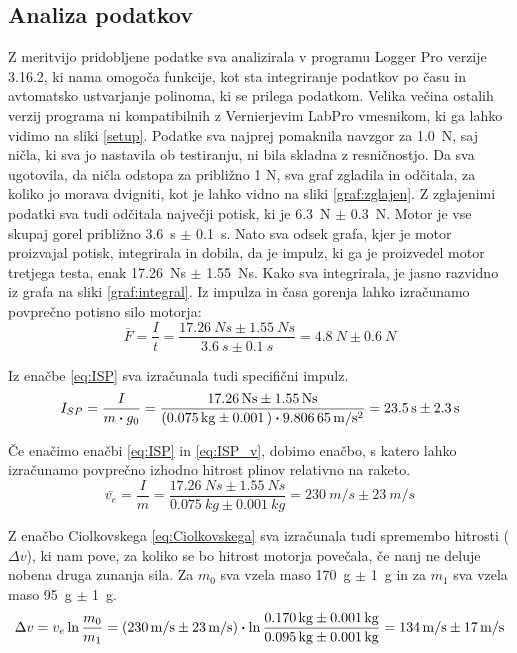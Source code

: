 \documentclass[titlepage, a4paper, twoside, final, 12pt]{article}
\begin{document}
		\subsection{Analiza podatkov}
		Z meritvijo pridobljene podatke sva analizirala v programu Logger Pro verzije 3.16.2, ki nama omogoča funkcije, kot sta integriranje podatkov po času in
		avtomatsko ustvarjanje polinoma, ki se prilega podatkom. Velika večina ostalih verzij programa ni kompatibilnih z Vernierjevim LabPro vmesnikom, ki ga lahko vidimo na sliki \ref{setup}.
		Podatke sva najprej pomaknila navzgor za \SI{1,0}{N}, saj ničla, ki sva jo nastavila ob testiranju, ni bila skladna z resničnostjo.
		Da sva ugotovila, da ničla odstopa za približno 1 N, sva graf zgladila in odčitala, za koliko jo morava dvigniti, kot je lahko vidno na sliki \ref{graf:zglajen}.
		Z zglajenimi podatki sva tudi odčitala največji potisk, ki je \SI{6,3}{N} $\pm$ \SI{0,3}{N}. Motor je vse skupaj gorel približno \SI{3,6}{s} $\pm$ \SI{0,1}{s}.
		Nato sva odsek grafa, kjer je motor proizvajal potisk, integrirala in dobila, da je impulz, ki ga je proizvedel motor tretjega testa, enak \SI{17,26}{Ns} $\pm$ \SI{1,55}{Ns}.
		Kako sva integrirala, je jasno razvidno iz grafa na sliki \ref{graf:integral}.
		Iz impulza in časa gorenja lahko izračunamo povprečno potisno silo motorja:
		\begin{equation}
			\bar{F} = \frac{I}{t} = \frac{\SI{17,26}{Ns} \pm \SI{1,55}{Ns}}{\SI{3,6}{s} \pm \SI{0,1}{s}} = \SI{4,8}{N} \pm \SI{0,6}{N}
		\end{equation}

		Iz enačbe \ref{eq:ISP} sva izračunala tudi specifični impulz.
		\begin{equation}
			I_{SP} = \frac{I}{m \vdot g_0} = \frac{\SI{17,26}{Ns} \pm \SI{1,55}{Ns}}{(\SI{0,075}{kg} \pm \SI{0,001}) \vdot \SI{9.80665}{m/s^2}} = \SI{23,5}{s} \pm \SI{2,3}{s}
		\end{equation}

		Če enačimo enačbi \ref{eq:ISP} in \ref{eq:ISP_v}, dobimo enačbo, s katero lahko izračunamo povprečno izhodno hitrost plinov relativno na raketo.
		\begin{equation}
			\bar{v_e} = \frac{I}{m} = \frac{\SI{17,26}{Ns} \pm \SI{1,55}{Ns}}{\SI{0,075}{kg} \pm \SI{0,001}{kg}} = \SI{230}{m/s} \pm \SI{23}{m/s}
		\end{equation}

		Z enačbo Ciolkovskega \ref{eq:Ciolkovskega} sva izračunala tudi spremembo hitrosti ($\Delta v$), ki nam pove, za koliko se bo hitrost motorja povečala, če nanj ne deluje nobena druga zunanja sila.
		Za $m_0$ sva vzela maso \SI{170}{g} $\pm$ \SI{1}{g} in za $m_1$ sva vzela maso \SI{95}{g} $\pm$ \SI{1}{g}.
		\begin{equation}
			\Delta v = v_e \ln{\frac{m_0}{m_1}} = (\SI{230}{m/s} \pm \SI{23}{m/s})\vdot \ln{\frac{\SI{0,170}{kg} \pm \SI{0,001}{kg}}{\SI{0,095}{kg} \pm \SI{0,001}{kg}}} = \SI{134}{m/s} \pm \SI{17}{m/s}
		\end{equation}
\end{document}
